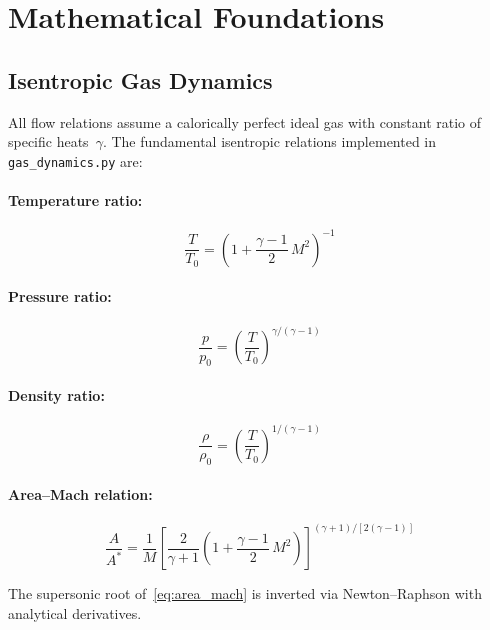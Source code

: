\documentclass[11pt,a4paper]{article}
\begin{document}
\section{Mathematical Foundations}

\subsection{Isentropic Gas Dynamics}

All flow relations assume a calorically perfect ideal gas with constant ratio of specific heats~$\gamma$. The fundamental isentropic relations implemented in \texttt{gas\_dynamics.py} are:

\paragraph{Temperature ratio:}
\begin{equation}
\frac{T}{T_0} = \left(1 + \frac{\gamma-1}{2}\,M^2\right)^{-1}
\end{equation}

\paragraph{Pressure ratio:}
\begin{equation}
\frac{p}{p_0} = \left(\frac{T}{T_0}\right)^{\gamma/(\gamma-1)}
\end{equation}

\paragraph{Density ratio:}
\begin{equation}
\frac{\rho}{\rho_0} = \left(\frac{T}{T_0}\right)^{1/(\gamma-1)}
\end{equation}

\paragraph{Area--Mach relation:}
\begin{equation}
\frac{A}{A^*} = \frac{1}{M}\left[\frac{2}{\gamma+1}\left(1+\frac{\gamma-1}{2}\,M^2\right)\right]^{(\gamma+1)/[2(\gamma-1)]}
\label{eq:area_mach}
\end{equation}

The supersonic root of~\eqref{eq:area_mach} is inverted via Newton--Raphson with analytical derivatives.
\end{document}
